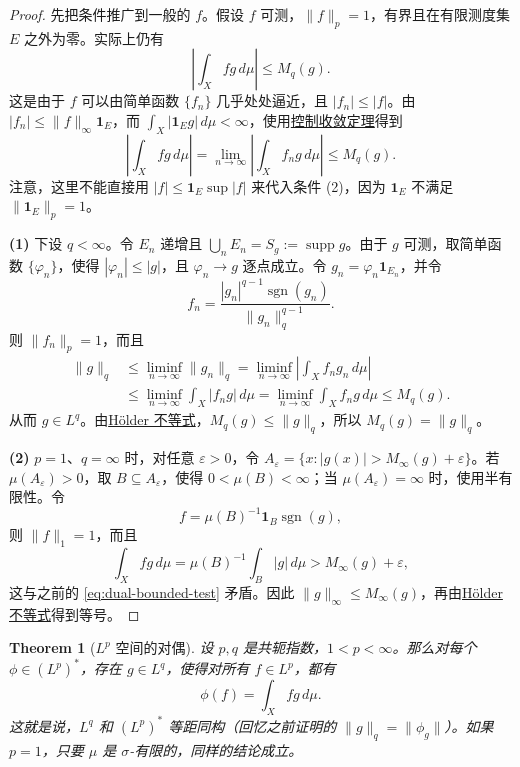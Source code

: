 \documentclass[12pt,letterpaper,twoside,openright]{ctexbook}
\theoremstyle{bluehead}
\newtheorem{theorem}{Theorem}
\theoremstyle{olivehead}
\theoremstyle{orangehead}
\theoremstyle{redremark}
\begin{document}
\begin{proof}
先把条件推广到一般的 $f$。假设 $f$ 可测，$\|f\|_p=1$，有界且在有限测度集 $E$ 之外为零。实际上仍有
\begin{equation}
\left|\int_Xfg\,d\mu\right|\leq M_q(g).\tag{*}\label{eq:dual-bounded-test}
\end{equation}
这是由于 $f$ 可以由简单函数 $\{f_n\}$ 几乎处处逼近，且 $|f_n|\leq|f|$。由 $|f_n|\leq\|f\|_\infty\mathbf1_E$，而 $\int_X|\mathbf1_Eg|\,d\mu<\infty$，使用\hyperref[thm:dominated-convergence]{控制收敛定理}得到
\[
\left|\int_Xfg\,d\mu\right|
=\lim_{n\to\infty}\left|\int_Xf_ng\,d\mu\right|
\leq M_q(g).
\]
注意，这里不能直接用 $|f|\leq\mathbf1_E\sup|f|$ 来代入条件 (2)，因为 $\mathbf1_E$ 不满足 $\|\mathbf1_E\|_p=1$。

\textbf{(1)} 下设 $q<\infty$。令 $E_n$ 递增且 $\bigcup_nE_n=S_g:=\operatorname{supp}g$。由于 $g$ 可测，取简单函数 $\{\varphi_n\}$，使得 $|\varphi_n|\leq|g|$，且 $\varphi_n\to g$ 逐点成立。令 $g_n=\varphi_n\mathbf1_{E_n}$，并令
\[
f_n=\frac{|g_n|^{q-1}\operatorname{sgn}(g_n)}{\|g_n\|_q^{q-1}}.
\]
则 $\|f_n\|_p=1$，而且
\[
\begin{aligned}
\|g\|_q
&\leq\liminf_{n\to\infty}\|g_n\|_q
=\liminf_{n\to\infty}\left|\int_Xf_ng_n\,d\mu\right|\\
&\leq\liminf_{n\to\infty}\int_X|f_ng|\,d\mu
=\liminf_{n\to\infty}\int_Xf_ng\,d\mu
\leq M_q(g).
\end{aligned}
\]
从而 $g\in L^q$。由\hyperref[thm:holder-lp]{Hölder 不等式}，$M_q(g)\leq\|g\|_q$，所以 $M_q(g)=\|g\|_q$。

\textbf{(2)} $p=1$、$q=\infty$ 时，对任意 $\varepsilon>0$，令 $A_\varepsilon=\{x:|g(x)|>M_\infty(g)+\varepsilon\}$。若 $\mu(A_\varepsilon)>0$，取 $B\subseteq A_\varepsilon$，使得 $0<\mu(B)<\infty$；当 $\mu(A_\varepsilon)=\infty$ 时，使用半有限性。令
\[
f=\mu(B)^{-1}\mathbf1_B\operatorname{sgn}(g),
\]
则 $\|f\|_1=1$，而且
\[
\int_Xfg\,d\mu=\mu(B)^{-1}\int_B|g|\,d\mu
>M_\infty(g)+\varepsilon,
\]
这与之前的 \eqref{eq:dual-bounded-test} 矛盾。因此 $\|g\|_\infty\leq M_\infty(g)$，再由\hyperref[thm:holder-lp]{Hölder 不等式}得到等号。
\end{proof}
\begin{theorem}[\texorpdfstring{$L^p$}{Lp} 空间的对偶]
设 $p,q$ 是共轭指数，$1<p<\infty$。那么对每个 $\phi\in(L^p)^*$，存在 $g\in L^q$，使得对所有 $f\in L^p$，都有
\[
\phi(f)=\int_Xfg\,d\mu.
\]
这就是说，$L^q$ 和 $(L^p)^*$ 等距同构（回忆之前证明的 $\|g\|_q=\|\phi_g\|$）。如果 $p=1$，只要 $\mu$ 是 $\sigma$-有限的，同样的结论成立。
\end{theorem}

\begin{center}
\setlength{\fboxsep}{12pt}
\end{center}
\end{document}
